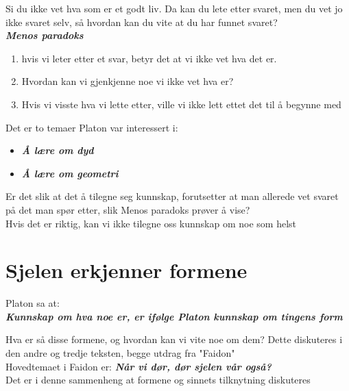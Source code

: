 \documentclass[11pt, a4paper]{article}
\begin{document}
Si du ikke vet hva som er et godt liv. Da kan du lete etter svaret, men du vet jo ikke svaret selv, så hvordan kan du vite at du har funnet svaret?\\





\textbf{\textit{Menos paradoks}}
\begin{enumerate}
    \item hvis vi leter etter et svar, betyr det at vi ikke vet hva det er.
    \item Hvordan kan vi gjenkjenne noe vi ikke vet hva er?
    \item Hvis vi visste hva vi lette etter, ville vi ikke lett ettet det til å begynne med
\end{enumerate}



Det er to temaer Platon var interessert i:

\begin{itemize}
    \item \textbf{\textit{Å lære om dyd}}
    \item \textbf{\textit{Å lære om geometri}}
\end{itemize}


Er det slik at det å tilegne seg kunnskap, forutsetter at man allerede vet svaret på det man spør etter, slik Menos paradoks prøver å vise?\\

Hvis det er riktig, kan vi ikke tilegne oss kunnskap om noe som helst



\section{Sjelen erkjenner formene}

Platon sa at:\\
\textbf{\textit{Kunnskap om hva noe er, er ifølge Platon kunnskap om tingens form}}

Hva er så disse formene, og hvordan kan vi vite noe om dem? Dette diskuteres i den andre og tredje teksten, begge utdrag fra "Faidon"\\

Hovedtemaet i Faidon er: \textbf{\textit{Når vi dør, dør sjelen vår også?}}\\

Det er i denne sammenheng at formene og sinnets tilknytning diskuteres\\
\end{document}
